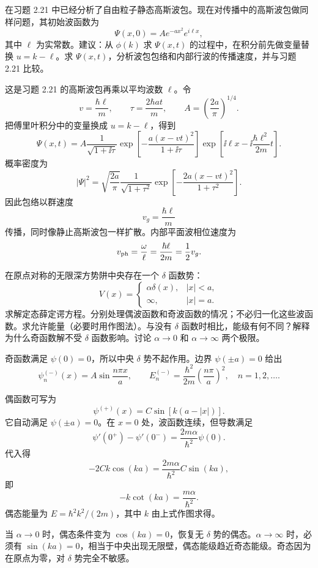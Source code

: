 \begin{question}
在习题 2.21 中已经分析了自由粒子静态高斯波包。现在对传播中的高斯波包做同样问题，其初始波函数为
\[
\Psi(x,0)=Ae^{-ax^2}e^{i\ell x},
\]
其中 $\ell$ 为实常数。建议：从 $\phi(k)$ 求 $\Psi(x,t)$ 的过程中，在积分前先做变量替换 $u=k-\ell$。求 $\Psi(x,t)$，分析波包包络和内部行波的传播速度，并与习题 2.21 比较。
\end{question}
\begin{solution}
这是习题 2.21 的高斯波包再乘以平均波数 $\ell$。令
\[
v=\frac{\hbar\ell}{m},
\qquad
\tau=\frac{2\hbar at}{m},
\qquad
A=\left(\frac{2a}{\pi}\right)^{1/4}.
\]
把傅里叶积分中的变量换成 $u=k-\ell$，得到
\[
\Psi(x,t)=A\frac1{\sqrt{1+\ii\tau}}
\exp\left[-\frac{a(x-vt)^2}{1+\ii\tau}\right]
\exp\left[\ii\ell x-\ii\frac{\hbar\ell^2}{2m}t\right].
\]
概率密度为
\[
|\Psi|^2=\sqrt{\frac{2a}{\pi}}\frac1{\sqrt{1+\tau^2}}
\exp\left[-\frac{2a(x-vt)^2}{1+\tau^2}\right].
\]
因此包络以群速度
\[
v_g=\frac{\hbar\ell}{m}
\]
传播，同时像静止高斯波包一样扩散。内部平面波相位速度为
\[
v_{\rm ph}=\frac{\omega}{\ell}=\frac{\hbar\ell}{2m}=\frac12v_g.
\]
\end{solution}

\begin{question}
在原点对称的无限深方势阱中央存在一个 $\delta$ 函数势：
\[
V(x)=\begin{cases}\alpha\delta(x),& |x|<a,\\ \infty,& |x|=a.
\end{cases}
\]
求解定态薛定谔方程。分别处理偶波函数和奇波函数的情况；不必归一化这些波函数。求允许能量（必要时用作图法）。与没有 $\delta$ 函数时相比，能级有何不同？解释为什么奇函数解不受 $\delta$ 函数影响。讨论 $\alpha\to0$ 和 $\alpha\to\infty$ 两个极限。
\end{question}
\begin{solution}
奇函数满足 $\psi(0)=0$，所以中央 $\delta$ 势不起作用。边界 $\psi(\pm a)=0$ 给出
\[
\psi_n^{(-)}(x)=A\sin\frac{n\pi x}{a},
\qquad
E_n^{(-)}=\frac{\hbar^2}{2m}\left(\frac{n\pi}{a}\right)^2,
\quad n=1,2,\ldots.
\]

偶函数可写为
\[
\psi^{(+)}(x)=C\sin[k(a-|x|)].
\]
它自动满足 $\psi(\pm a)=0$。在 $x=0$ 处，波函数连续，但导数满足
\[
\psi'(0^+)-\psi'(0^-)=\frac{2m\alpha}{\hbar^2}\psi(0).
\]
代入得
\[
-2Ck\cos(ka)=\frac{2m\alpha}{\hbar^2}C\sin(ka),
\]
即
\[
-k\cot(ka)=\frac{m\alpha}{\hbar^2}.
\]
偶态能量为 $E=\hbar^2k^2/(2m)$，其中 $k$ 由上式作图求得。

当 $\alpha\to0$ 时，偶态条件变为 $\cos(ka)=0$，恢复无 $\delta$ 势的偶态。$\alpha\to\infty$ 时，必须有 $\sin(ka)=0$，相当于中央出现无限壁，偶态能级趋近奇态能级。奇态因为在原点为零，对 $\delta$ 势完全不敏感。
\end{solution}

